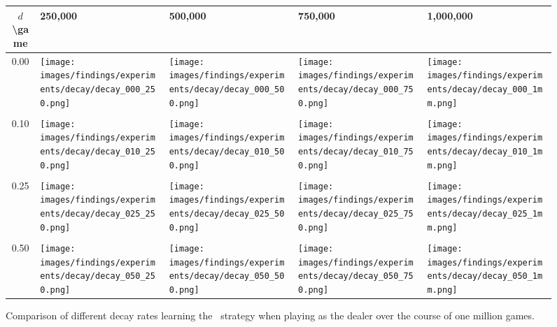 \begin{figure}[h]
	\centering

	\begin{tabular}{c | l l l l}
		$d$\textbackslash game & 250,000 & 500,000 & 750,000 & 1,000,000 \\
		\hline
		0.00 &
			\parbox[c]{5em}{\texttt{[image: images/findings/experiments/decay/decay\_000\_250.png]}} & %
			\parbox[c]{5em}{\texttt{[image: images/findings/experiments/decay/decay\_000\_500.png]}} & %
			\parbox[c]{5em}{\texttt{[image: images/findings/experiments/decay/decay\_000\_750.png]}} & %
			\parbox[c]{5em}{\texttt{[image: images/findings/experiments/decay/decay\_000\_1mm.png]}} \\ %
		\\
		0.10 & 
			\parbox[c]{5em}{\texttt{[image: images/findings/experiments/decay/decay\_010\_250.png]}} & %
			\parbox[c]{5em}{\texttt{[image: images/findings/experiments/decay/decay\_010\_500.png]}} & %
			\parbox[c]{5em}{\texttt{[image: images/findings/experiments/decay/decay\_010\_750.png]}} & %
			\parbox[c]{5em}{\texttt{[image: images/findings/experiments/decay/decay\_010\_1mm.png]}} \\ %
		\\
		0.25 & 
			\parbox[c]{5em}{\texttt{[image: images/findings/experiments/decay/decay\_025\_250.png]}} & %
			\parbox[c]{5em}{\texttt{[image: images/findings/experiments/decay/decay\_025\_500.png]}} & %
			\parbox[c]{5em}{\texttt{[image: images/findings/experiments/decay/decay\_025\_750.png]}} & %
			\parbox[c]{5em}{\texttt{[image: images/findings/experiments/decay/decay\_025\_1mm.png]}} \\ %
		\\
		0.50 & 
			\parbox[c]{5em}{\texttt{[image: images/findings/experiments/decay/decay\_050\_250.png]}} & %
			\parbox[c]{5em}{\texttt{[image: images/findings/experiments/decay/decay\_050\_500.png]}} & %
			\parbox[c]{5em}{\texttt{[image: images/findings/experiments/decay/decay\_050\_750.png]}} & %
			\parbox[c]{5em}{\texttt{[image: images/findings/experiments/decay/decay\_050\_1mm.png]}} \\ %
	\end{tabular}

\caption{
	Comparison of different decay rates learning the \handmaxavg\ strategy
	when playing as the dealer
	over the course of one million games.
	}
\label{fig:expts-decay-comp}
\end{figure}
